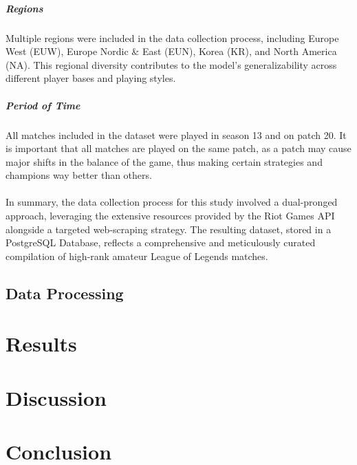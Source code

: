 \documentclass[12pt, a4paper, headinclude, twoside, plainheadsepline, open=right, numbers=noenddot, hidelinks, toc=listof, toc=bibliography]{scrreprt}
\begin{document}
\paragraph{Regions}
Multiple regions were included in the data collection process, including Europe West (EUW), Europe Nordic \& East (EUN), Korea (KR), and North America (NA).
This regional diversity contributes to the model's generalizability across different player bases and playing styles.
\paragraph{Period of Time}
All matches included in the dataset were played in season 13 and on patch 20.
It is important that all matches are played on the same patch, as a patch may cause major shifts in the balance of the game, thus making certain strategies and champions way better than others.
\\ \  \\
In summary, the data collection process for this study involved a dual-pronged approach, leveraging the extensive resources provided by the Riot Games API alongside a targeted web-scraping strategy.
The resulting dataset, stored in a PostgreSQL Database, reflects a comprehensive and meticulously curated compilation of high-rank amateur League of Legends matches.


\section{Data Processing}
\label{sec:data_processing}



\chapter{Results}
\label{chap:results}


\chapter{Discussion}
\label{chap:discussion}


\chapter{Conclusion}
\label{chap:conclusion}

%
%
%
\printbibliography






\listoffigures																			%
\listoftables																			%
\cleardoublepage{}	%
\printacronyms[heading={chapter*}, name={List of Abbreviations}]
\end{document}
